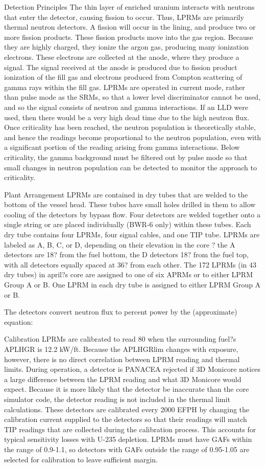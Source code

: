 \documentclass[10pt]{article}
\begin{document}
Detection Principles
The thin layer of enriched uranium interacts with neutrons that enter the detector, causing fission to occur. Thus, LPRMs are primarily thermal neutron detectors. A fission will occur in the lining, and produce two or more fission products. These fission products move into the gas region. Because they are highly charged, they ionize the argon gas, producing many ionization electrons. These electrons are collected at the anode, where they produce a signal. The signal received at the anode is produced due to fission product ionization of the fill gas and electrons produced from Compton scattering of gamma rays within the fill gas. LPRMs are operated in current mode, rather than pulse mode as the SRMs, so that a lower level discriminator cannot be used, and so the signal consists of neutron and gamma interactions. If an LLD were used, then there would be a very high dead time due to the high neutron flux. Once criticality has been reached, the neutron population is theoretically stable, and hence the readings become proportional to the neutron population, even with a significant portion of the reading arising from gamma interactions. Below criticality, the gamma background must be filtered out by pulse mode so that small changes in neutron population can be detected to monitor the approach to criticality. 

Plant Arrangement
LPRMs are contained in dry tubes that are welded to the bottom of the vessel head. These tubes have small holes drilled in them to allow cooling of the detectors by bypass flow. Four detectors are welded together onto a single string or are placed individually (BWR-6 only) within these tubes. Each dry tube contains four LPRMs, four signal cables, and one TIP tube. LPRMs are labeled as A, B, C, or D, depending on their elevation in the core ? the A detectors are 18? from the fuel bottom, the D detectors 18? from the fuel top, with all detectors equally spaced at 36? from each other. The 172 LPRMs (in 43 dry tubes) in april?s core are assigned to one of six APRMs or to either LPRM Group A or B. One LPRM in each dry tube is assigned to either LPRM Group A or B. 

The detectors convert neutron flux to percent power by the (approximate) equation:



Calibration
LPRMs are calibrated to read 80 when the surrounding fuel?s APLHGR is 12.2 kW/ft. Because the APLHGRlim changes with exposure, however, there is no direct correlation between LPRM reading and thermal limits. During operation, a detector is PANACEA rejected if 3D Monicore notices a large difference between the LPRM reading and what 3D Monicore would expect. Because it is more likely that the detector be inaccurate than the core simulator code, the detector reading is not included in the thermal limit calculations. These detectors are calibrated every 2000 EFPH by changing the calibration current supplied to the detectors so that their readings will match TIP readings that are collected during the calibration process. This accounts for typical sensitivity losses with U-235 depletion. LPRMs must have GAFs within the range of 0.9-1.1, so detectors with GAFs outside the range of 0.95-1.05 are selected for calibration to leave sufficient margin. 
\end{document}
